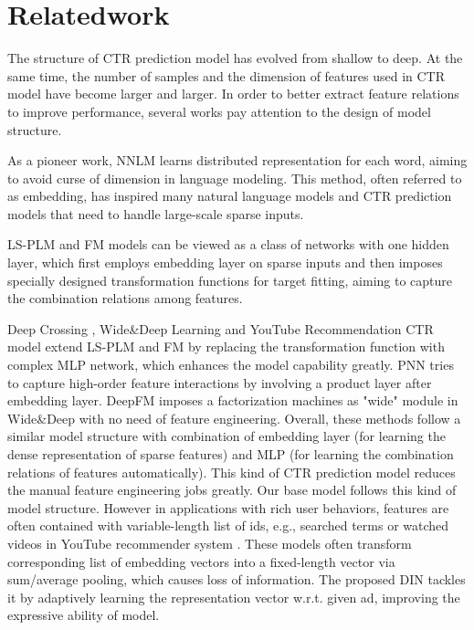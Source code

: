 \section{Relatedwork}
The structure of CTR prediction model has evolved from shallow to deep. At the same time, the number of samples and the dimension of features used in CTR model have become larger and larger. In order to better extract feature relations to improve performance, several works pay attention to the design of model structure.

As a pioneer work, NNLM \cite{bengio:nnlm} learns distributed representation for each word,
aiming to avoid curse of dimension in language modeling.
This method, often referred to as embedding,
has inspired many natural language models and CTR prediction models that need to handle large-scale sparse inputs.

LS-PLM \cite{MLR} and FM \cite{rendle:fm} models can be viewed as a class of networks with one hidden layer, which first 
 employs embedding layer on sparse inputs and then imposes specially designed transformation functions for target fitting, aiming to capture the combination relations among features.

Deep Crossing \cite{deep_crossing}, Wide\&Deep Learning \cite{widedeep} and YouTube Recommendation CTR model \cite{youtube:recommend} extend LS-PLM and FM by replacing the transformation function with complex MLP network, which enhances the model capability greatly. PNN\cite{PNN} tries to capture high-order feature interactions by involving a product layer after embedding layer. DeepFM\cite{DeepFM} imposes a factorization machines as "wide" module in Wide\&Deep \cite{widedeep} with no need of feature engineering.
Overall, these methods follow a similar model structure with combination of embedding layer (for learning the dense representation of sparse features) and MLP (for learning the combination relations of features automatically).
This kind of CTR prediction model reduces the manual feature engineering jobs greatly. %
Our base model follows this kind of model structure. 
However in applications with rich user behaviors, features are often contained with variable-length list of ids, e.g., searched terms or watched videos in YouTube recommender system \cite{youtube:recommend}. These models often transform corresponding list of embedding vectors into a fixed-length vector via sum/average pooling, which causes loss of information.
The proposed DIN tackles it by adaptively learning the representation vector w.r.t. given ad, improving the expressive ability of model.   

